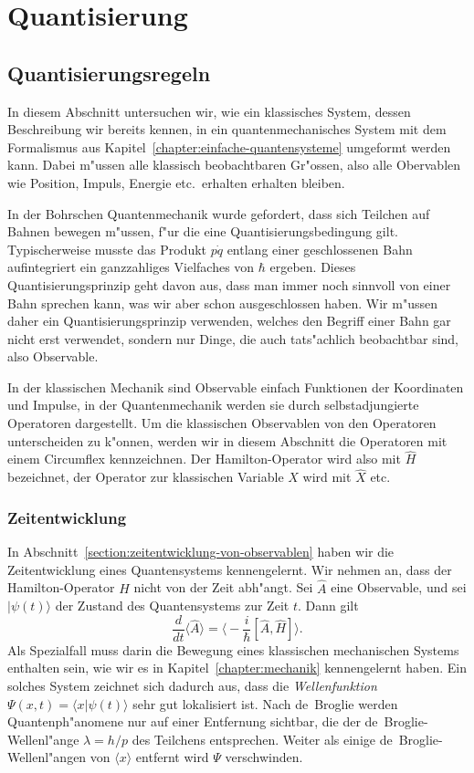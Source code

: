 \chapter{Quantisierung\label{chapter:quantisierung}}
\rhead{}

\section{Quantisierungsregeln}
In diesem Abschnitt untersuchen wir, wie ein klassisches System, dessen
Beschreibung wir bereits kennen, in ein quantenmechanisches System 
mit dem Formalismus aus Kapitel~\ref{chapter:einfache-quantensysteme}
umgeformt werden kann.
Dabei m"ussen alle klassisch beobachtbaren Gr"ossen, also alle Obervablen
wie Position, Impuls, Energie etc.~erhalten erhalten bleiben.

In der Bohrschen Quantenmechanik wurde gefordert, dass 
sich Teilchen auf Bahnen bewegen m"ussen, f"ur die eine
Quantisierungsbedingung gilt.
Typischerweise musste das Produkt $p\dot q$ entlang einer geschlossenen
Bahn aufintegriert ein ganzzahliges Vielfaches von $\hbar$ ergeben.
Dieses Quantisierungsprinzip geht davon aus, dass man immer noch sinnvoll
von einer Bahn sprechen kann, was wir aber schon ausgeschlossen haben.
Wir m"ussen daher ein Quantisierungsprinzip verwenden, welches den
Begriff einer Bahn gar nicht erst verwendet, sondern nur Dinge, die
auch tats"achlich beobachtbar sind, also Observable.

In der klassischen Mechanik sind Observable einfach Funktionen
der Koordinaten und Impulse,
in der Quantenmechanik werden sie durch selbstadjungierte
Operatoren dargestellt.
Um die klassischen Observablen von den Operatoren unterscheiden zu
k"onnen, werden wir in diesem Abschnitt die Operatoren mit einem
Circumflex kennzeichnen.
Der Hamilton-Operator wird also mit $\hat H$ bezeichnet, 
der Operator zur klassischen Variable $X$ wird mit $\hat X$ etc.

\subsection{Zeitentwicklung}
In Abschnitt~\ref{section:zeitentwicklung-von-observablen} haben wir die
Zeitentwicklung eines Quantensystems kennengelernt.
Wir nehmen an, dass der Hamilton-Operator $H$ nicht von der Zeit abh"angt.
Sei $\hat A$ eine Observable, und sei $|\psi(t)\rangle$ der Zustand des
Quantensystems zur Zeit $t$.
Dann gilt
\[
\frac{d}{dt}\langle \hat A\rangle
=
\biggl\langle -\frac{i}{\hbar}[\hat A,\hat H] \biggr\rangle.
\]
Als Spezialfall muss darin die Bewegung eines klassischen mechanischen Systems
enthalten sein, wie wir es in Kapitel~\ref{chapter:mechanik}
kennengelernt haben.
Ein solches System zeichnet sich dadurch aus, dass die {\em Wellenfunktion}
\label{Wellenfunktion}
$\Psi(x,t)=\langle x|\psi(t)\rangle$
sehr gut lokalisiert ist.
Nach de~Broglie werden Quantenph"anomene nur auf einer Entfernung sichtbar,
die der de~Broglie-Wellenl"ange $\lambda=h/p$ des Teilchens entsprechen.
Weiter als einige de~Broglie-Wellenl"angen von $\langle x\rangle$
entfernt wird $\Psi$ verschwinden.

